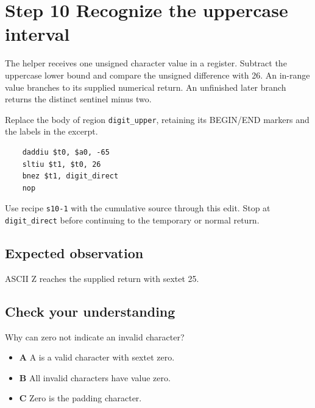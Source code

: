 \section{Step 10 Recognize the uppercase interval}\label{base64-s10}

The helper receives one unsigned character value in a register. Subtract the uppercase lower bound and compare the unsigned difference with 26. An in-range value branches to its supplied numerical return. An unfinished later branch returns the distinct sentinel minus two.

Replace the body of region \texttt{digit\_upper}, retaining its BEGIN/END markers and the labels in the excerpt.

\begin{verbatim}
    daddiu $t0, $a0, -65
    sltiu $t1, $t0, 26
    bnez $t1, digit_direct
    nop
\end{verbatim}

Use recipe \texttt{s10-1} with the cumulative source through this edit. Stop at \texttt{digit\_direct} before continuing to the temporary or normal return.

\subsection{Expected observation}
ASCII Z reaches the supplied return with sextet 25.

\subsection{Check your understanding}
Why can zero not indicate an invalid character?

\begin{itemize}
\item \textbf{A} A is a valid character with sextet zero.
\item \textbf{B} All invalid characters have value zero.
\item \textbf{C} Zero is the padding character.
\end{itemize}
